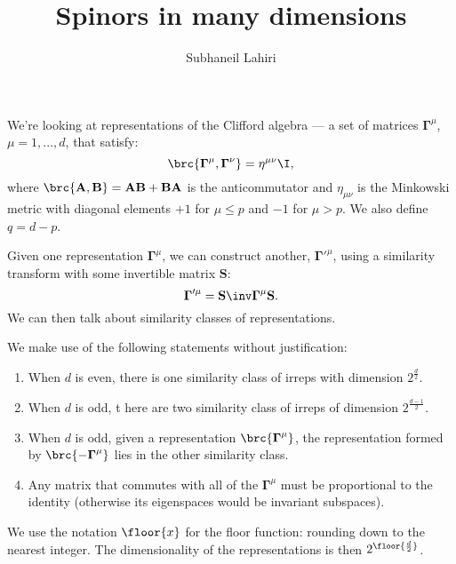 \documentclass[11pt]{article}
\newcommand{\Gammab}{\boldsymbol{\Gamma}}
\renewcommand{\S}{\mathbf{S}}
\newcommand{\A}{\mathbf{A}}
\newcommand{\B}{\mathbf{B}}
\begin{document}
\title{Spinors in many dimensions}
\author{Subhaneil Lahiri}
\date{}
\maketitle

We're looking at representations of the Clifford algebra --- a set of matrices $\Gammab^\mu$, $\mu = 1, ..., d$, that satisfy:
%
\begin{equation}\label{eq:clifford}
  \brc{ \Gammab^\mu, \Gammab^\nu } = \eta^{\mu\nu} \I,
\end{equation}
%
where $\brc{ \A, \B } = \A\B + \B\A$ is the anticommutator and $\eta_{\mu\nu}$ is the Minkowski metric with diagonal elements $+1$ for $\mu \leq p$ and $-1$ for $\mu > p$. We also define $q = d - p$.

Given one representation $\Gammab^\mu$, we can construct another, $\Gammab'^{\mu}$, using a similarity transform with some invertible matrix $\S$:
%
\begin{equation}\label{eq:similarity}
  \Gammab'^{\mu} = \S\inv \Gammab^\mu \S.
\end{equation}
%
We can then talk about similarity classes of representations.

We make use of the following statements without justification:
%
\begin{enumerate}
  \item When $d$ is even, there is one similarity class of irreps with dimension $2^{ \frac{d}{2} }$. \label{it:even}
  \item When $d$ is odd, t here are two similarity class of irreps of dimension $2^{ \frac{d-1}{2} }$. \label{it:odd}
  \item When $d$ is odd, given a representation $\brc{\Gammab^\mu}$, the representation formed by $\brc{ -\Gammab^\mu }$ lies in the other similarity class. \label{it:oddchi}
  \item Any matrix that commutes with all of the $\Gammab^\mu$ must be proportional to the identity (otherwise its eigenspaces would be invariant subspaces). \label{it:commute}
\end{enumerate}

We use the notation $\floor{x}$ for the floor function: rounding down to the nearest integer.
The dimensionality of the representations is then $2^{ \floor{ \frac{d}{2} } }$.
\end{document}
